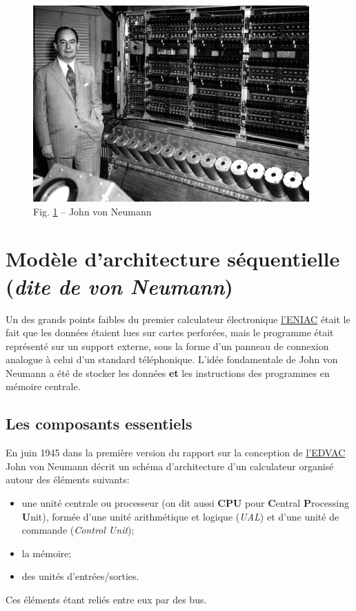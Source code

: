 \documentclass[11pt,french]{article}
\makeatletter
\def\maxwidth{\ifdim\Gin@nat@width>\linewidth\linewidth
    \else\Gin@nat@width\fi}
\let\Oldincludegraphics\includegraphics
\renewcommand{\includegraphics}[1]{\Oldincludegraphics[width=.8\maxwidth]{#1}}
\makeatother
\begin{document}
\begin{figure}[h]
	\begin{center}
		\includegraphics{../img/IAS_von_Neumann.jpg}
	\end{center}
	\caption{Fig. \ref{fig:vonneumann} -- John von Neumann}
	\label{fig:vonneumann}
\end{figure}
	
    \hypertarget{moduxe8le-darchitecture-suxe9quentielle-dite-de-von-neumann}{%
\section{\texorpdfstring{Modèle d'architecture séquentielle (\emph{dite
de von
Neumann})}{Modèle d'architecture séquentielle (dite de von Neumann)}}\label{moduxe8le-darchitecture-suxe9quentielle-dite-de-von-neumann}}

Un des grands points faibles du premier calculateur électronique \href{https://fr.wikipedia.org/wiki/ENIAC}{l'ENIAC} était le fait que les données étaient lues sur cartes perforées, mais le programme était représenté sur un support externe, sous la forme d’un panneau de connexion analogue à celui d’un standard téléphonique. 
L'idée fondamentale de John von Neumann a été de stocker les données \textbf{et} les
instructions des programmes en mémoire centrale.

\hypertarget{les-composants-essentiels}{%
\subsection{Les composants essentiels}\label{les-composants-essentiels}}

En juin 1945 dans la première version du rapport sur la conception de
\href{https://fr.wikipedia.org/wiki/Electronic_Discrete_Variable_Automatic_Computer}{l'EDVAC}
John von Neumann décrit un schéma d'architecture d'un calculateur
organisé autour des éléments suivants:
\begin{itemize}
\item une unité centrale ou processeur (on dit aussi \textbf{CPU} pour \textbf{C}entral
\textbf{P}rocessing \textbf{U}nit), formée d'une unité arithmétique et logique (\emph{UAL}) et d'une unité de commande (\emph{Control Unit}); 
\item la mémoire; 
\item des unités d'entrées/sorties.
\end{itemize}
Ces éléments étant reliés entre eux par des bus.
\end{document}
